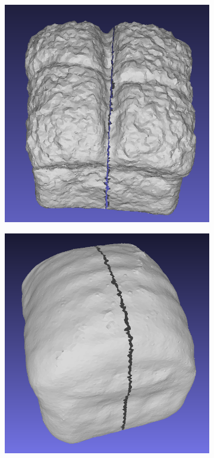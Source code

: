 \begin{figure}[ht]
    \centering
    \small
    \begin{subfigure}[b]{0.25\textwidth}
        \centering
        \includegraphics[width=\textwidth]{figures/technical/magic3d_split_bread.png}
        \caption{}
    \end{subfigure}
    \begin{subfigure}[b]{0.248\textwidth}
        \centering
        \includegraphics[width=\textwidth]{figures/technical/magic123_split_bread.png}

\end{subfigure}
\end{figure}
